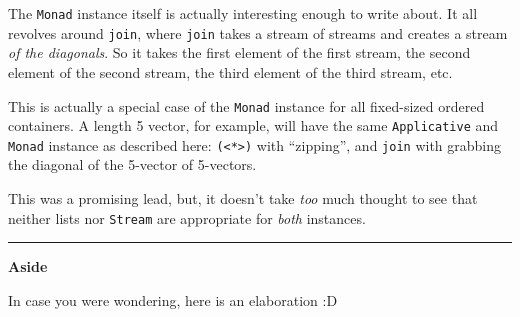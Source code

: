 \documentclass[]{article}
\begin{document}
The \texttt{Monad} instance itself is actually interesting enough to write
about. It all revolves around \texttt{join}, where \texttt{join} takes a stream
of streams and creates a stream \emph{of the diagonals}. So it takes the first
element of the first stream, the second element of the second stream, the third
element of the third stream, etc.

This is actually a special case of the \texttt{Monad} instance for all
fixed-sized ordered containers. A length 5 vector, for example, will have the
same \texttt{Applicative} and \texttt{Monad} instance as described here:
\texttt{(\textless{}*\textgreater{})} with ``zipping'', and \texttt{join} with
grabbing the diagonal of the 5-vector of 5-vectors.

This was a promising lead, but, it doesn't take \emph{too} much thought to see
that neither lists nor \texttt{Stream} are appropriate for \emph{both}
instances.

\begin{center}\rule{0.5\linewidth}{0.5pt}\end{center}

\textbf{Aside}

In case you were wondering, here is an elaboration :D
\end{document}
